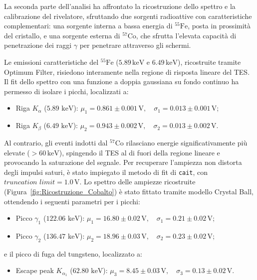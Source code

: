 La seconda parte dell'analisi ha affrontato la ricostruzione dello spettro e la calibrazione del rivelatore, sfruttando due sorgenti radioattive con caratteristiche complementari: una sorgente interna a bassa energia di $^{55}\text{Fe}$, posta in prossimità del cristallo, e una sorgente esterna di $^{57}\text{Co}$, che sfrutta l'elevata capacità di penetrazione dei raggi $\gamma$ per penetrare attraverso gli schermi.

Le emissioni caratteristiche del $^{55}\text{Fe}$ ($5.89\,\text{keV}$ e $6.49\,\text{keV}$), ricostruite tramite Optimum Filter, risiedono interamente nella regione di risposta lineare del TES. Il fit dello spettro con una funzione a doppia gaussiana su fondo continuo ha permesso di isolare i picchi, localizzati a:
\begin{itemize}
    \item Riga $K_\alpha$ ($5.89\text{ keV}$): $\mu_1 = 0.861 \pm 0.001\,\text{V}, \quad \sigma_1 = 0.013 \pm 0.001\,\text{V}$;
    \item Riga $K_\beta$ ($6.49\text{ keV}$): $\mu_2 = 0.943 \pm 0.002\,\text{V}, \quad \sigma_2 = 0.013 \pm 0.002\,\text{V}$.
\end{itemize}

Al contrario, gli eventi indotti dal $^{57}\text{Co}$ rilasciano energie significativamente più elevate ($> 60\,\text{keV}$), spingendo il TES al di fuori della regione lineare e provocando la saturazione del segnale. Per recuperare l'ampiezza non distorta degli impulsi saturi, è stato impiegato il metodo di fit di \texttt{cait}, con $\textit{truncation limit} = 1.0\,\text{V}$. Lo spettro delle ampiezze ricostruite (Figura~\ref{fig:Ricostruzione_Cobalto}) è stato fittato tramite modello Crystal Ball, ottendendo i seguenti parametri per i picchi:
\begin{itemize}
    \item Picco $\gamma_1$ ($122.06\text{ keV}$): $\mu_1 = 16.80 \pm 0.02\,\text{V}, \quad \sigma_1 = 0.21 \pm 0.02\,\text{V}$;
    \item Picco $\gamma_2$ ($136.47\text{ keV}$): $\mu_2 = 18.96 \pm 0.03\,\text{V}, \quad \sigma_2 = 0.23 \pm 0.02\,\text{V}$;
\end{itemize}
e il picco di fuga del tungsteno, localizzato a:
\begin{itemize}
    \item Escape peak $K_{\alpha_1}$ ($62.80\text{ keV}$): $\mu_3 = 8.45 \pm 0.03\,\text{V}, \quad \sigma_3 = 0.13 \pm 0.02\,\text{V}$.
\end{itemize}

